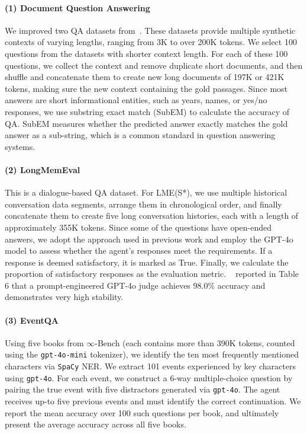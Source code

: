 \paragraph{(1) Document Question Answering} We improved two QA datasets from~\citep{RULER}. These datasets provide multiple synthetic contexts of varying lengths, ranging from 3K to over 200K tokens. We select 100 questions from the datasets with shorter context length. For each of these 100 questions, we collect the context and remove duplicate short documents, and then shuffle and concatenate them to create new long documents of 197K or 421K tokens, making sure the new context containing the gold passages. Since most answers are short informational entities, such as years, names, or yes/no responses, we use substring exact match (SubEM) to calculate the accuracy of QA. SubEM measures whether the predicted answer exactly matches the gold answer as a sub-string, which is a common standard in question answering systems. 

\paragraph{(2) LongMemEval} This is a dialogue-based QA dataset. For LME(S*), we use multiple historical conversation data segments, arrange them in chronological order, and finally concatenate them to create five long conversation histories, each with a length of approximately 355K tokens. Since some of the questions have open-ended answers, we adopt the approach used in previous work and employ the GPT-4o model to assess whether the agent's responses meet the requirements. If a response is deemed satisfactory, it is marked as True. Finally, we calculate the proportion of satisfactory responses as the evaluation metric. ~\citet{longmemeval} reported in Table 6 that a prompt-engineered GPT-4o judge achieves 98.0\% accuracy and demonstrates very high stability. 


\paragraph{(3) EventQA} Using five books from $\infty$-Bench (each contains more than 390K tokens, counted using the \texttt{gpt-4o-mini} tokenizer), we identify the ten most frequently mentioned characters via \texttt{SpaCy} NER. We extract 101 events experienced by key characters using \texttt{gpt-4o}. For each event, we construct a 6-way multiple-choice question by pairing the true event with five distractors generated via \texttt{gpt-4o}. The agent receives up-to five previous events and must identify the correct continuation. We report the mean accuracy over 100 such questions per book, and ultimately present the average accuracy across all five books.



